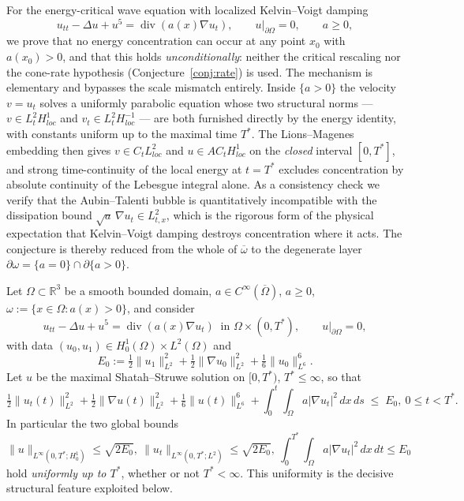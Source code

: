 \documentclass[11pt,letterpaper]{amsart}
\newcommand{\dive}{\operatorname{div}}
\newcommand{\Om}{\Omega}
\begin{document}
For the energy-critical wave equation with localized Kelvin--Voigt damping
\[
u_{tt}-\Delta u+u^5=\dive(a(x)\nabla u_t),\qquad u|_{\partial\Om}=0,\qquad a\ge0,
\]
we prove that no energy concentration can occur at any point $x_0$ with $a(x_0)>0$, and that this
holds \emph{unconditionally}: neither the critical rescaling nor the cone-rate hypothesis
(Conjecture~\ref{conj:rate}) is used. The mechanism is elementary and bypasses the scale mismatch entirely.
Inside $\{a>0\}$ the velocity $v=u_t$ solves a uniformly parabolic equation whose two structural
norms --- $v\in L^2_tH^1_{loc}$ and $v_t\in L^2_tH^{-1}_{loc}$ --- are both furnished directly by
the energy identity, with constants uniform up to the maximal time $T^*$. The Lions--Magenes
embedding then gives $v\in C_tL^2_{loc}$ and $u\in AC_tH^1_{loc}$ on the \emph{closed} interval
$[0,T^*]$, and strong time-continuity of the local energy at $t=T^*$ excludes concentration by
absolute continuity of the Lebesgue integral alone. As a consistency check we verify that the
Aubin--Talenti bubble is quantitatively incompatible with the dissipation bound
$\sqrt a\,\nabla u_t\in L^2_{t,x}$, which is the rigorous form of the physical expectation that
Kelvin--Voigt damping destroys concentration where it acts. The conjecture is thereby reduced
from the whole of $\overline\omega$ to the degenerate layer $\partial\omega=\{a=0\}\cap\partial\{a>0\}$.


Let $\Om\subset\mathbb R^3$ be a smooth bounded domain, $a\in C^\infty(\overline\Om)$, $a\ge0$,
$\omega:=\{x\in\Om: a(x)>0\}$, and consider
\begin{equation}\label{eq:main}
u_{tt}-\Delta u+u^5=\dive(a(x)\nabla u_t)\ \text{ in }\Om\times(0,T^*),\qquad u|_{\partial\Om}=0,
\end{equation}
with data $(u_0,u_1)\in H_0^1(\Om)\times L^2(\Om)$ and
\[
E_0:=\tfrac12\|u_1\|_{L^2}^2+\tfrac12\|\nabla u_0\|_{L^2}^2+\tfrac16\|u_0\|_{L^6}^6.
\]
Let $u$ be the maximal Shatah--Struwe solution on $[0,T^*)$, $T^*\le\infty$, so that
\begin{equation}\label{eq:energy}
\tfrac12\|u_t(t)\|_{L^2}^2+\tfrac12\|\nabla u(t)\|_{L^2}^2+\tfrac16\|u(t)\|_{L^6}^6
+\int_0^t\!\!\int_\Om a|\nabla u_t|^2\,dx\,ds \;\le\; E_0,~ 0\le t<T^*.
\end{equation}
In particular the two global bounds
\begin{equation}\label{eq:two-bounds}
\|u\|_{L^\infty(0,T^*;H_0^1)}\le\sqrt{2E_0},~
\|u_t\|_{L^\infty(0,T^*;L^2)}\le\sqrt{2E_0},~
\int_0^{T^*}\!\!\!\int_\Om a|\nabla u_t|^2\,dx\,dt\le E_0
\end{equation}
hold \emph{uniformly up to $T^*$}, whether or not $T^*<\infty$. This uniformity is the decisive
structural feature exploited below.
\end{document}
